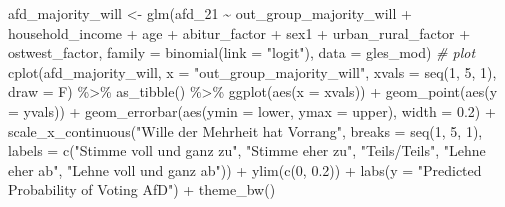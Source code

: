 \documentclass[
]{article}
\newenvironment{Shaded}{\begin{snugshade}}{\end{snugshade}}
\newcommand{\AttributeTok}[1]{\textcolor[rgb]{0.77,0.63,0.00}{#1}}
\newcommand{\CommentTok}[1]{\textcolor[rgb]{0.56,0.35,0.01}{\textit{#1}}}
\newcommand{\DecValTok}[1]{\textcolor[rgb]{0.00,0.00,0.81}{#1}}
\newcommand{\FloatTok}[1]{\textcolor[rgb]{0.00,0.00,0.81}{#1}}
\newcommand{\FunctionTok}[1]{\textcolor[rgb]{0.00,0.00,0.00}{#1}}
\newcommand{\NormalTok}[1]{#1}
\newcommand{\OtherTok}[1]{\textcolor[rgb]{0.56,0.35,0.01}{#1}}
\newcommand{\SpecialCharTok}[1]{\textcolor[rgb]{0.00,0.00,0.00}{#1}}
\newcommand{\StringTok}[1]{\textcolor[rgb]{0.31,0.60,0.02}{#1}}
\begin{document}
\begin{Shaded}
\begin{Highlighting}[]
\NormalTok{afd\_majority\_will }\OtherTok{\textless{}{-}} \FunctionTok{glm}\NormalTok{(afd\_21 }\SpecialCharTok{\textasciitilde{}}\NormalTok{ out\_group\_majority\_will }\SpecialCharTok{+}\NormalTok{ household\_income }\SpecialCharTok{+}\NormalTok{ age }\SpecialCharTok{+}\NormalTok{ abitur\_factor }\SpecialCharTok{+}\NormalTok{ sex1 }\SpecialCharTok{+}\NormalTok{ urban\_rural\_factor }\SpecialCharTok{+}\NormalTok{ ostwest\_factor, }\AttributeTok{family =} \FunctionTok{binomial}\NormalTok{(}\AttributeTok{link =} \StringTok{"logit"}\NormalTok{), }\AttributeTok{data =}\NormalTok{ gles\_mod)}
\CommentTok{\# plot }
\FunctionTok{cplot}\NormalTok{(afd\_majority\_will, }\AttributeTok{x =} \StringTok{"out\_group\_majority\_will"}\NormalTok{, }
      \AttributeTok{xvals =} \FunctionTok{seq}\NormalTok{(}\DecValTok{1}\NormalTok{, }\DecValTok{5}\NormalTok{, }\DecValTok{1}\NormalTok{), }\AttributeTok{draw =}\NormalTok{ F) }\SpecialCharTok{\%\textgreater{}\%}
  \FunctionTok{as\_tibble}\NormalTok{() }\SpecialCharTok{\%\textgreater{}\%}
  \FunctionTok{ggplot}\NormalTok{(}\FunctionTok{aes}\NormalTok{(}\AttributeTok{x =}\NormalTok{ xvals)) }\SpecialCharTok{+}
  \FunctionTok{geom\_point}\NormalTok{(}\FunctionTok{aes}\NormalTok{(}\AttributeTok{y =}\NormalTok{ yvals)) }\SpecialCharTok{+}
  \FunctionTok{geom\_errorbar}\NormalTok{(}\FunctionTok{aes}\NormalTok{(}\AttributeTok{ymin =}\NormalTok{ lower, }\AttributeTok{ymax =}\NormalTok{ upper), }\AttributeTok{width =} \FloatTok{0.2}\NormalTok{) }\SpecialCharTok{+}
  \FunctionTok{scale\_x\_continuous}\NormalTok{(}\StringTok{"Wille der Mehrheit hat Vorrang"}\NormalTok{, }
                     \AttributeTok{breaks =} \FunctionTok{seq}\NormalTok{(}\DecValTok{1}\NormalTok{, }\DecValTok{5}\NormalTok{, }\DecValTok{1}\NormalTok{),}
                     \AttributeTok{labels =} \FunctionTok{c}\NormalTok{(}\StringTok{"Stimme voll und ganz zu"}\NormalTok{, }\StringTok{"Stimme eher zu"}\NormalTok{, }
                                \StringTok{"Teils/Teils"}\NormalTok{, }\StringTok{"Lehne eher ab"}\NormalTok{, }
                                \StringTok{"Lehne voll und ganz ab"}\NormalTok{)) }\SpecialCharTok{+}
  \FunctionTok{ylim}\NormalTok{(}\FunctionTok{c}\NormalTok{(}\DecValTok{0}\NormalTok{, }\FloatTok{0.2}\NormalTok{)) }\SpecialCharTok{+}
  \FunctionTok{labs}\NormalTok{(}\AttributeTok{y =} \StringTok{"Predicted Probability of Voting AfD"}\NormalTok{) }\SpecialCharTok{+}
  \FunctionTok{theme\_bw}\NormalTok{()}
\end{Highlighting}
\end{Shaded}
\end{document}
